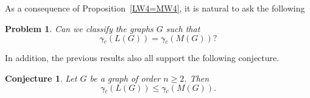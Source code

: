 \documentclass[a4paper,12pt, reqno]{amsart}
\newtheorem{Proposition}[Theorem]{Proposition}
\newtheorem{Remark}[Theorem]{Remark}
\newtheorem{Problem}[Theorem]{Problem}
\newtheorem{Conjecture}[Theorem]{Conjecture}
\begin{document}
As a consequence of Proposition~\ref{LW4=MW4}, it is natural to ask the following
\begin{Problem}
Can we classify the graphs $G$ such that 
$$\gamma{\tilde{}} _{c}(L(G)) = \gamma{\tilde{}} _{c}(M(G))?$$
\end{Problem}
%
%	
In addition, the previous results also all support the following conjecture.
\begin{Conjecture}
	Let $G$ be a graph of order $n\ge 2$. Then
	$$\gamma{\tilde{}} _{c}(L(G)) \le \gamma{\tilde{}} _{c}(M(G)).$$
\end{Conjecture}
\end{document}
